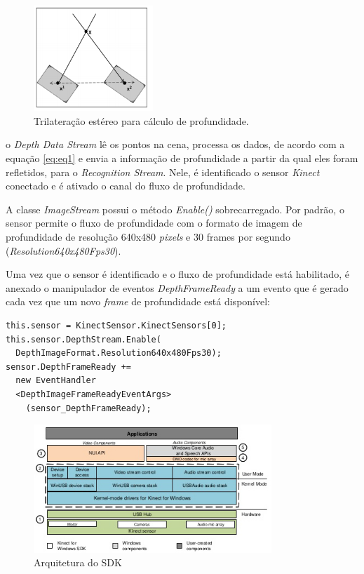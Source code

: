 \begin{figure}[!ht]
\centering
\includegraphics[width=0.4\textwidth]{images/trilateracao_estereo.png}
\caption{Trilateração estéreo para cálculo de profundidade.}
\label{fig:trilatStereo}
\end{figure}

o \textit{Depth Data Stream} lê os pontos na cena, processa os dados, de acordo com a equação \ref{eq:eq1} e envia a informação de profundidade a partir da qual eles foram refletidos, para o \textit{Recognition Stream}. Nele, é identificado o sensor \textit{Kinect} conectado e é ativado o canal do fluxo de profundidade.

A classe \textit{ImageStream} possui o método \textit{Enable()} sobrecarregado. Por padrão, o sensor permite o fluxo de profundidade com o formato de imagem de profundidade de resolução 640x480 \textit{pixels} e 30 frames por segundo (\textit{Resolution640x480Fps30}).

Uma vez que o sensor é identificado e o fluxo de profundidade está habilitado, é anexado o manipulador de eventos \textit{DepthFrameReady} a um evento que é gerado cada vez que um novo \textit{frame} de profundidade está disponível:

\begin{verbatim}
this.sensor = KinectSensor.KinectSensors[0];
this.sensor.DepthStream.Enable(
  DepthImageFormat.Resolution640x480Fps30);
sensor.DepthFrameReady +=
  new EventHandler
  <DepthImageFrameReadyEventArgs>
    (sensor_DepthFrameReady);
\end{verbatim}


\begin{figure}[ht]
\centering
\includegraphics[width=0.8\textwidth]{images/sdk_architecture_color.png}
\caption{Arquitetura do SDK}
\label{fig:sdk_architecture_color}
\end{figure}


